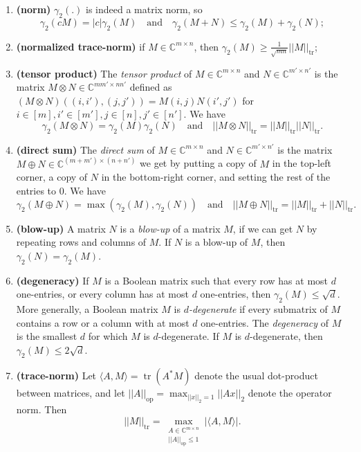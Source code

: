 \documentclass[11pt]{article}
\theoremstyle{plain}
\theoremstyle{definition}
\DeclareMathOperator{\tr}{tr}
\begin{document}
	\begin{enumerate}
		\item \textbf{(norm)} $\gamma_2(.)$ is indeed a matrix norm, so $$\gamma_2(cM)=|c|\gamma_2(M)\quad\text{and}\quad\gamma_2(M+N)\leq \gamma_2(M)+\gamma_2(N);$$
		\item \textbf{(normalized trace-norm)} if $M\in \mathbb{C}^{m\times n}$, then $\gamma_2(M)\geq \frac{1}{\sqrt{mn}}||M||_{\tr}$;
		\item \textbf{(tensor product)} The \emph{tensor product} of $M\in \mathbb{C}^{m\times n}$ and $N\in \mathbb{C}^{m'\times n'}$ is the matrix $M\otimes N\in \mathbb{C}^{mm'\times nn'}$ defined as $(M\otimes N)((i,i'),(j,j'))=M(i,j)N(i',j')$ for $i\in [m], i'\in [m'], j\in [n], j'\in [n']$. We have 
        $$\gamma_2(M\otimes N)=\gamma_2(M)\gamma_2(N)\quad\text{and}\quad||M\otimes N||_{\tr}=||M||_{\tr}||N||_{\tr}.$$
		\item \textbf{(direct sum)} The \emph{direct sum} of $M\in \mathbb{C}^{m\times n}$ and $N\in \mathbb{C}^{m'\times n'}$ is the matrix $M\oplus N\in \mathbb{C}^{(m+m')\times (n+n')}$ we get by putting a copy of $M$ in the top-left corner, a copy of $N$ in the bottom-right corner, and setting the rest of the entries to 0. We have  $$\gamma_2(M\oplus N)=\max(\gamma_2(M),\gamma_2(N))\quad\text{and}\quad||M\oplus N||_{\tr}=||M||_{\tr}+||N||_{\tr}.$$
		\item \textbf{(blow-up)} A matrix $N$ is a \emph{blow-up} of a matrix $M$, if we can get $N$ by repeating rows and columns of $M$. If $N$ is a blow-up of $M$, then $\gamma_2(N)=\gamma_2(M)$.
		\item \textbf{(degeneracy)} If $M$ is a Boolean matrix such that every row has at most $d$ one-entries, or every column has at most $d$ one-entries, then $\gamma_2(M)\leq \sqrt{d}$. More generally, a Boolean matrix $M$ is \emph{$d$-degenerate} if every submatrix of $M$ contains a row or a column with at most $d$ one-entries. The \emph{degeneracy} of $M$ is the smallest $d$ for which $M$ is $d$-degenerate. If $M$ is $d$-degenerate, then $\gamma_2(M)\leq 2\sqrt{d}$.
		
		\item \textbf{(trace-norm)} Let $\langle A,M\rangle=\tr(A^*M)$ denote the usual dot-product between matrices, and let $||A||_{\text{op}}=\max_{||x||_2=1}||Ax||_2$ denote the operator norm. Then $$||M||_{\text{tr}}=\max_{\substack{A\in \mathbb{C}^{m\times n}\\ ||A||_{\text{op}}\leq 1}}|\langle A,M\rangle|.$$
	\end{enumerate}
	
\end{document}
